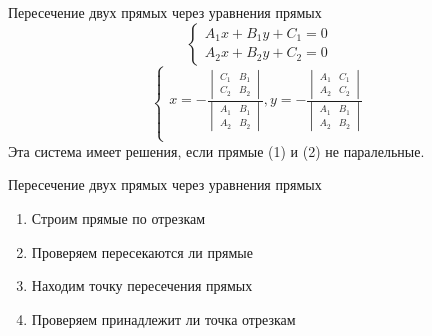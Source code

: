 \documentclass{beamer}
\begin{document}
\begin{frame}{Пересечение двух прямых через уравнения прямых}
\begin{equation*}
 \begin{cases}
   A_1x + B_1y + C_1 = 0\\
   A_2x + B_2y + C_2 = 0
 \end{cases}
\end{equation*}
\begin{equation*}
 \begin{cases}
    x = - \frac{\begin{vmatrix}
C_1 & B_1\\
C_2 & B_2
\end{vmatrix}}{
\begin{vmatrix}
A_1 & B_1\\
A_2 & B_2
\end{vmatrix}
}
,y = - \frac{\begin{vmatrix}
A_1 & C_1\\
A_2 & C_2
\end{vmatrix}}{
\begin{vmatrix}
A_1 & B_1\\
A_2 & B_2
\end{vmatrix}
}\\
 \end{cases}
\end{equation*}
Эта система имеет решения, если прямые (1) и (2) не паралельные.
\end{frame}

\begin{frame}{Пересечение двух прямых через уравнения прямых}
    \begin{enumerate}
    \item Строим прямые по отрезкам
    \item Проверяем пересекаются ли прямые
    \item Находим точку пересечения прямых
    \item Проверяем принадлежит ли точка отрезкам
    \end{enumerate}
\end{frame}
\end{document}
